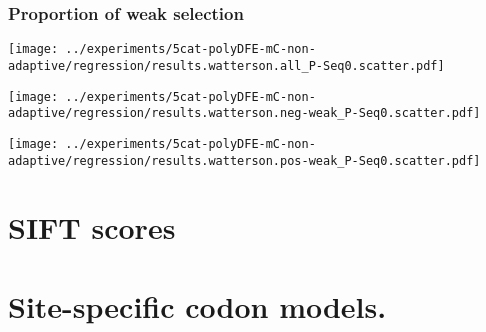 \documentclass{article}
\begin{document}
    \subsubsection{Proportion of weak selection}
    \begin{minipage}{0.32\linewidth}
        \texttt{[image: ../experiments/5cat-polyDFE-mC-non-adaptive/regression/results.watterson.all\_P-Seq0.scatter.pdf]}
    \end{minipage}
    \begin{minipage}{0.32\linewidth}
        \texttt{[image: ../experiments/5cat-polyDFE-mC-non-adaptive/regression/results.watterson.neg-weak\_P-Seq0.scatter.pdf]}
    \end{minipage}
    \begin{minipage}{0.32\linewidth}
        \texttt{[image: ../experiments/5cat-polyDFE-mC-non-adaptive/regression/results.watterson.pos-weak\_P-Seq0.scatter.pdf]}
    \end{minipage}

    

    \section{SIFT scores}
    

    \section{Site-specific codon models.}
    
\end{document}
